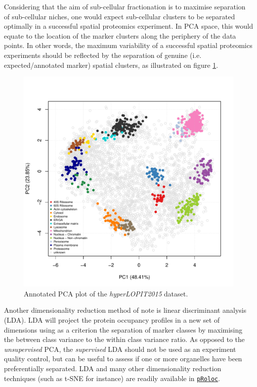 \documentclass[12pt]{article}\usepackage[]{graphicx}\usepackage[]{color}
\newenvironment{knitrout}{}{} %
\newcommand{\Rpackage}[1]{\texttt{#1}}
\newcommand\Biocpkg[1]{%
  {\href{http://bioconductor.org/packages/#1}%
    {\Rpackage{#1}}}}
\begin{document}
Considering that the aim of sub-cellular fractionation is to maximise
separation of sub-cellular niches, one would expect sub-cellular
clusters to be separated optimally in a successful spatial proteomics
experiment. In PCA space, this would equate to the location of the
marker clusters along the periphery of the data points. In other
words, the maximum variability of a successful spatial proteomics
experiments should be reflected by the separation of genuine
(i.e. expected/annotated marker) spatial clusters, as illustrated on
figure \ref{fig:pcahl}.

\begin{figure}[ht]
  \centering
\begin{knitrout}
\color{fgcolor}
\includegraphics[width=0.75\linewidth]{figure/pcahl-1} 

\end{knitrout}
  \caption{Annotated PCA plot of the \textit{hyperLOPIT2015} dataset.}
  \label{fig:pcahl}
\end{figure}

Another dimensionality reduction method of note is linear discriminant
analysis (LDA). LDA will project the protein occupancy profiles in a
new set of dimensions using as a criterion the separation of marker
classes by maximising the between class variance to the within class
variance ratio. As opposed to the \textit{unsupervised} PCA, the
\textit{supervised} LDA should not be used as an experiment quality
control, but can be useful to assess if one or more organelles have
been preferentially separated. LDA and many other dimensionality
reduction techniques (such as t-SNE \cite{Maaten:2008} for instance)
are readily available in \Biocpkg{pRoloc}.
\end{document}
